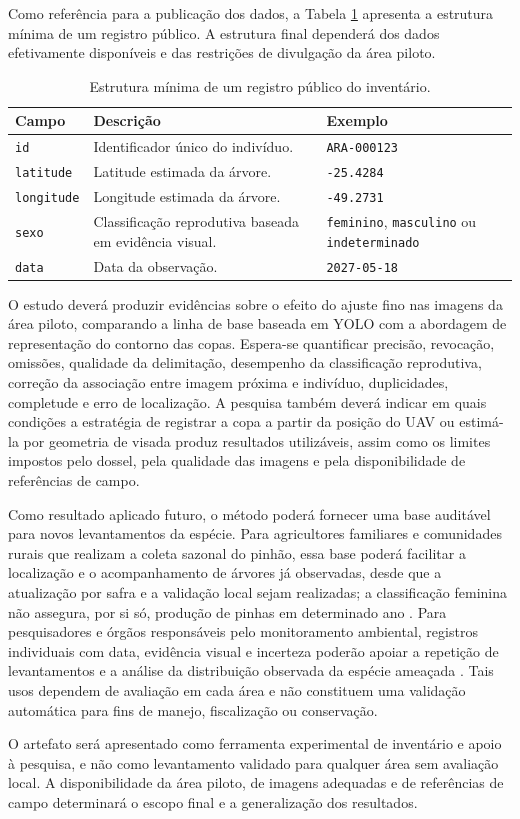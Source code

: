 Como referência para a publicação dos dados, a Tabela \ref{tab:registro-publico} apresenta a estrutura mínima de um registro público. A estrutura final dependerá dos dados efetivamente disponíveis e das restrições de divulgação da área piloto.

\begin{table}[htbp]
\centering
\small
\caption{Estrutura mínima de um registro público do inventário.}
\label{tab:registro-publico}
\begin{tabular}{p{3.5cm} p{5.5cm} p{3.3cm}}
\hline
\textbf{Campo} & \textbf{Descrição} & \textbf{Exemplo} \\
\hline
\texttt{id} & Identificador único do indivíduo. & \texttt{ARA-000123} \\
\texttt{latitude} & Latitude estimada da árvore. & \texttt{-25.4284} \\
\texttt{longitude} & Longitude estimada da árvore. & \texttt{-49.2731} \\
\texttt{sexo} & Classificação reprodutiva baseada em evidência visual. & \texttt{feminino}, \texttt{masculino} ou \texttt{indeterminado} \\
\texttt{data} & Data da observação. & \texttt{2027-05-18} \\
\hline
\end{tabular}
\end{table}

O estudo deverá produzir evidências sobre o efeito do ajuste fino nas imagens da área piloto, comparando a linha de base baseada em YOLO com a abordagem de representação do contorno das copas. Espera-se quantificar precisão, revocação, omissões, qualidade da delimitação, desempenho da classificação reprodutiva, correção da associação entre imagem próxima e indivíduo, duplicidades, completude e erro de localização. A pesquisa também deverá indicar em quais condições a estratégia de registrar a copa a partir da posição do UAV ou estimá-la por geometria de visada produz resultados utilizáveis, assim como os limites impostos pelo dossel, pela qualidade das imagens e pela disponibilidade de referências de campo.

Como resultado aplicado futuro, o método poderá fornecer uma base auditável para novos levantamentos da espécie. Para agricultores familiares e comunidades rurais que realizam a coleta sazonal do pinhão, essa base poderá facilitar a localização e o acompanhamento de árvores já observadas, desde que a atualização por safra e a validação local sejam realizadas; a classificação feminina não assegura, por si só, produção de pinhas em determinado ano \citep{ipa2024}. Para pesquisadores e órgãos responsáveis pelo monitoramento ambiental, registros individuais com data, evidência visual e incerteza poderão apoiar a repetição de levantamentos e a análise da distribuição observada da espécie ameaçada \citep{mma2022}. Tais usos dependem de avaliação em cada área e não constituem uma validação automática para fins de manejo, fiscalização ou conservação.

O artefato será apresentado como ferramenta experimental de inventário e apoio à pesquisa, e não como levantamento validado para qualquer área sem avaliação local. A disponibilidade da área piloto, de imagens adequadas e de referências de campo determinará o escopo final e a generalização dos resultados.
